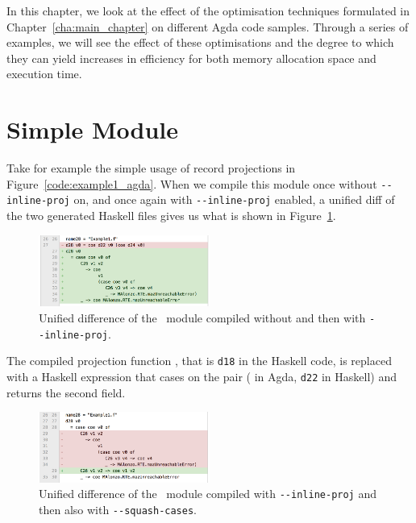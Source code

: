 In this chapter, we look at the effect of the optimisation techniques formulated in Chapter~\ref{cha:main_chapter} on different Agda code samples. Through a series of examples, we will see the effect of these optimisations and the degree to which they can yield increases in efficiency for both memory allocation space and execution time.

\section{Simple Module}



Take for example the simple usage of record projections in Figure~\ref{code:example1_agda}. When we compile this module once without \texttt{-{}-inline-proj} on, and once again with \texttt{-{}-inline-proj} enabled, a unified diff of the two generated Haskell files gives us what is shown in Figure~\ref{fig:Example1_inline}.

\begin{figure}
    \centering
    \includegraphics[width=0.5\textwidth]{Figures/Example1_inline}
    \caption{Unified difference of the ~module compiled without and then with \texttt{-{}-inline-proj}.}
    \label{fig:Example1_inline}
\end{figure}

The compiled projection function , that is \lstinline{d18} in the Haskell code, is replaced with a Haskell expression that cases on the pair ( in Agda, \lstinline{d22} in Haskell) and returns the second field.


\begin{figure}
    \centering
    \includegraphics[width=0.5\textwidth]{Figures/Example1_squash}
    \caption{Unified difference of the ~module compiled  with \texttt{-{}-inline-proj} and then also with \texttt{-{}-squash-cases}.}
    \label{fig:Example1_squash}
\end{figure}

